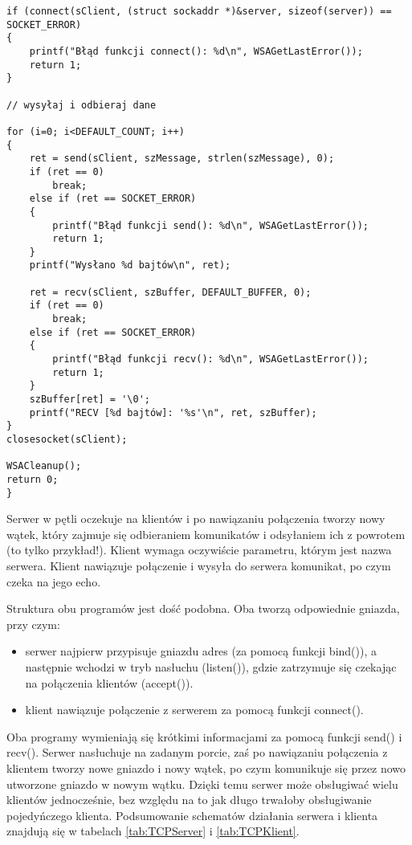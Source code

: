 \begin{scriptsize}
\begin{verbatim}
if (connect(sClient, (struct sockaddr *)&server, sizeof(server)) == SOCKET_ERROR)
{
    printf("Błąd funkcji connect(): %d\n", WSAGetLastError());
    return 1;
}

// wysyłaj i odbieraj dane

for (i=0; i<DEFAULT_COUNT; i++)
{
    ret = send(sClient, szMessage, strlen(szMessage), 0);
    if (ret == 0)
        break;
    else if (ret == SOCKET_ERROR)
    {
        printf("Błąd funkcji send(): %d\n", WSAGetLastError());
        return 1;
    }
    printf("Wysłano %d bajtów\n", ret);

    ret = recv(sClient, szBuffer, DEFAULT_BUFFER, 0);
    if (ret == 0)
        break;
    else if (ret == SOCKET_ERROR)
    {
        printf("Błąd funkcji recv(): %d\n", WSAGetLastError());
        return 1;
    }
    szBuffer[ret] = '\0';
    printf("RECV [%d bajtów]: '%s'\n", ret, szBuffer);
}
closesocket(sClient); 

WSACleanup();
return 0;
}
\end{verbatim}
\end{scriptsize}

Serwer w pętli oczekuje na klientów i po nawiązaniu połączenia tworzy nowy wątek, 
który zajmuje się odbieraniem komunikatów i odsyłaniem ich z powrotem (to tylko przykład!). 
Klient wymaga oczywiście parametru, którym jest nazwa serwera. 
Klient nawiązuje połączenie i wysyła do serwera komunikat, po czym czeka na jego echo. 

Struktura obu programów jest dość podobna. Oba tworzą odpowiednie gniazda, przy czym: 
\begin{itemize}
  \item serwer najpierw przypisuje gniazdu adres (za pomocą funkcji bind()), 
        a następnie wchodzi w tryb nasłuchu (listen()), gdzie zatrzymuje się czekając 
	na połączenia klientów (accept()). 
  \item klient nawiązuje połączenie z serwerem za pomocą funkcji connect(). 
\end{itemize}

Oba programy wymieniają się krótkimi informacjami za pomocą funkcji send() i recv(). 
Serwer nasłuchuje na zadanym porcie, zaś po nawiązaniu połączenia z klientem tworzy nowe 
gniazdo i nowy wątek, po czym komunikuje się przez nowo utworzone gniazdo w nowym wątku. 
Dzięki temu serwer może obsługiwać wielu klientów jednocześnie, bez względu na to jak długo 
trwałoby obsługiwanie pojedyńczego klienta. Podsumowanie schematów działania serwera i klienta
znajdują się w tabelach \ref{tab:TCPServer} i \ref{tab:TCPKlient}.

